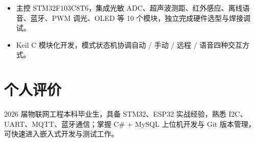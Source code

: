 \documentclass[10pt,a4paper]{article}
\begin{document}
\begin{itemize}[leftmargin=1.5em, itemsep=2pt, parsep=0pt, topsep=2pt]
    \item 主控 STM32F103C8T6，集成光敏 ADC、超声波测距、红外感应、离线语音、蓝牙、PWM 调光、OLED 等 10 个模块，独立完成硬件选型与焊接调试。
    \item Keil C 模块化开发，模式状态机协调自动 / 手动 / 远程 / 语音四种交互方式。
\end{itemize}

\vspace{0.1em}

\section{\faUser\hspace{0.4em}个人评价}

2026 届物联网工程本科毕业生，具备 STM32、ESP32 实战经验，熟悉 I2C、UART、MQTT、蓝牙通信；掌握 C\# + MySQL 上位机开发与 Git 版本管理，可快速进入嵌入式开发与测试工作。
\end{document}
